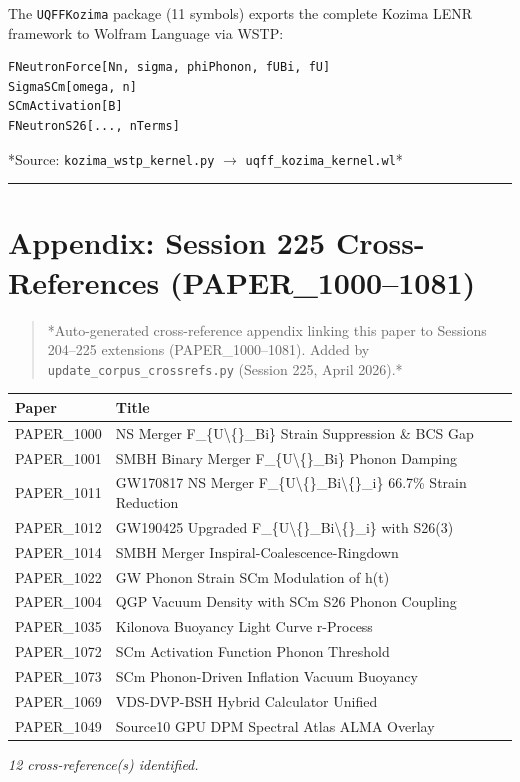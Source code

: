 \documentclass[11pt]{article}
\begin{document}
The \verb|UQFFKozima| package (11 symbols) exports the complete Kozima LENR framework to Wolfram Language via WSTP:

\begin{verbatim}
FNeutronForce[Nn, sigma, phiPhonon, fUBi, fU]
SigmaSCm[omega, n]
SCmActivation[B]
FNeutronS26[..., nTerms]
\end{verbatim}

*Source: \verb|kozima_wstp_kernel.py| $\to$ \verb|uqff_kozima_kernel.wl|*

\noindent\rule{\textwidth}{0.4pt}

\section*{Appendix: Session 225 Cross-References (PAPER\_1000--1081)}

\begin{quote}
*Auto-generated cross-reference appendix linking this paper to
Sessions 204--225 extensions (PAPER\_1000--1081). Added by
\verb|update_corpus_crossrefs.py| (Session 225, April 2026).*
\end{quote}

\begin{center}
\begin{longtable}{ll}
\toprule
Paper & Title \tabularnewline
\midrule
\endhead
PAPER\_1000 & NS Merger F\_\{U\textbackslash\{\}\_Bi\} Strain Suppression \& BCS Gap \tabularnewline
PAPER\_1001 & SMBH Binary Merger F\_\{U\textbackslash\{\}\_Bi\} Phonon Damping \tabularnewline
PAPER\_1011 & GW170817 NS Merger F\_\{U\textbackslash\{\}\_Bi\textbackslash\{\}\_i\} 66.7\% Strain Reduction \tabularnewline
PAPER\_1012 & GW190425 Upgraded F\_\{U\textbackslash\{\}\_Bi\textbackslash\{\}\_i\} with S26(3) \tabularnewline
PAPER\_1014 & SMBH Merger Inspiral-Coalescence-Ringdown \tabularnewline
PAPER\_1022 & GW Phonon Strain SCm Modulation of h(t) \tabularnewline
PAPER\_1004 & QGP Vacuum Density with SCm S26 Phonon Coupling \tabularnewline
PAPER\_1035 & Kilonova Buoyancy Light Curve r-Process \tabularnewline
PAPER\_1072 & SCm Activation Function Phonon Threshold \tabularnewline
PAPER\_1073 & SCm Phonon-Driven Inflation Vacuum Buoyancy \tabularnewline
PAPER\_1069 & VDS-DVP-BSH Hybrid Calculator Unified \tabularnewline
PAPER\_1049 & Source10 GPU DPM Spectral Atlas ALMA Overlay \tabularnewline
\bottomrule
\end{longtable}
\end{center}

\emph{12 cross-reference(s) identified.}
\end{document}
